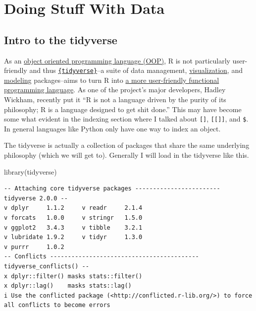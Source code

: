 \documentclass[
  letterpaper,
  DIV=11,
  numbers=noendperiod,
  oneside]{scrreprt}
\newenvironment{Shaded}{\begin{snugshade}}{\end{snugshade}}
\newcommand{\FunctionTok}[1]{\textcolor[rgb]{0.28,0.35,0.67}{#1}}
\newcommand{\NormalTok}[1]{\textcolor[rgb]{0.00,0.23,0.31}{#1}}
\begin{document}
\part{Doing Stuff With Data}


\hypertarget{intro-to-the-tidyverse}{%
\chapter{Intro to the tidyverse}\label{intro-to-the-tidyverse}}

As an
\href{https://en.wikipedia.org/wiki/Object-oriented_programming}{object
oriented programming language (OOP)}, R is not particularly
user-friendly and thus
\href{https://www.tidyverse.org/}{\texttt{\{tidyverse\}}}--a suite of
data management, \href{https://ggplot2.tidyverse.org/}{visualization},
and \href{https://www.tidymodels.org/}{modeling} packages--aims to turn
R into \href{https://tidyverse.tidyverse.org/articles/manifesto.html}{a
more user-friendly functional programming language}. As one of the
project's major developers, Hadley Wickham, recently put it ``R is not a
language driven by the purity of its philosophy; R is a language
designed to get shit done.'' This may have become some what evident in
the indexing section where I talked about \texttt{{[}{]}},
\texttt{{[}{[}{]}{]}}, and \texttt{\$}. In general languages like Python
only have one way to index an object.

The tidyverse is actually a collection of packages that share the same
underlying philosophy (which we will get to). Generally I will load in
the tidyverse like this.

\begin{Shaded}
\begin{Highlighting}[]
\FunctionTok{library}\NormalTok{(tidyverse)}
\end{Highlighting}
\end{Shaded}

\begin{verbatim}
-- Attaching core tidyverse packages ------------------------ tidyverse 2.0.0 --
v dplyr     1.1.2     v readr     2.1.4
v forcats   1.0.0     v stringr   1.5.0
v ggplot2   3.4.3     v tibble    3.2.1
v lubridate 1.9.2     v tidyr     1.3.0
v purrr     1.0.2     
-- Conflicts ------------------------------------------ tidyverse_conflicts() --
x dplyr::filter() masks stats::filter()
x dplyr::lag()    masks stats::lag()
i Use the conflicted package (<http://conflicted.r-lib.org/>) to force all conflicts to become errors
\end{verbatim}
\end{document}
